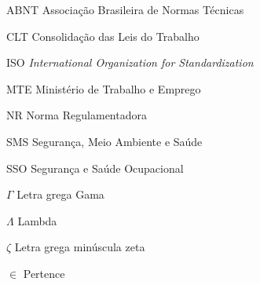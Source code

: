 \begin{siglas}
  \item[ABNT] Associação Brasileira de Normas Técnicas
  \item[CLT] Consolidação das Leis do Trabalho
  \item[ISO] \emph{International Organization for Standardization}
  \item[MTE] Ministério de Trabalho e Emprego
  \item[NR] Norma Regulamentadora
  \item[SMS] Segurança, Meio Ambiente e Saúde
  \item[SSO] Segurança e Saúde Ocupacional
\end{siglas}

\begin{simbolos}
  \item[$ \Gamma $] Letra grega Gama
  \item[$ \Lambda $] Lambda
  \item[$ \zeta $] Letra grega minúscula zeta
  \item[$ \in $] Pertence
\end{simbolos}
